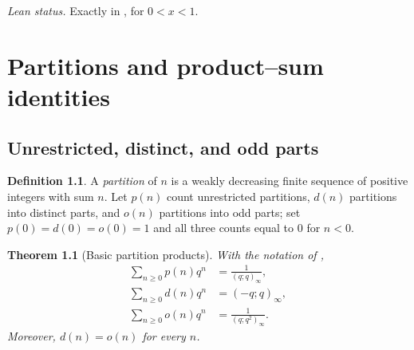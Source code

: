 \documentclass[11pt,a4paper,oneside,openany]{book}
\newtheorem{theorem}{Theorem}[chapter]
\theoremstyle{definition}
\newtheorem{definition}[definition]{Definition}
\theoremstyle{remark}
\begin{document}
\emph{Lean status.}  Exactly  in
, for $0<x<1$.




\chapter{Partitions and product--sum identities}\label{chap:partitions}

\section{Unrestricted, distinct, and odd parts}

\begin{definition}\label{qg:def-partition}
A \emph{partition} of $n$ is a weakly decreasing finite sequence of positive
integers with sum $n$.  Let $p(n)$ count unrestricted partitions,
$d(n)$ partitions into distinct parts, and $o(n)$ partitions into odd parts;
set $p(0)=d(0)=o(0)=1$ and all three counts equal to $0$ for $n<0$.
\end{definition}

\begin{theorem}[Basic partition products]\label{thm:partition-products}
With the notation of ,
\begin{align*}
 \sum_{n\ge0}p(n)q^n&=\frac1{(q;q)_\infty},\\
 \sum_{n\ge0}d(n)q^n&=(-q;q)_\infty,\\
 \sum_{n\ge0}o(n)q^n&=\frac1{(q;q^2)_\infty}.
\end{align*}
Moreover, $d(n)=o(n)$ for every $n$.
\end{theorem}
\end{document}
